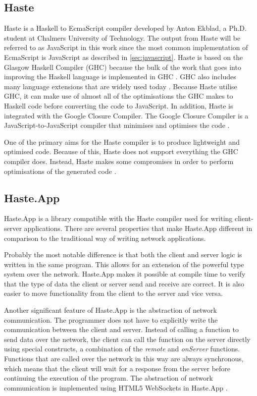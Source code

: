 \documentclass[a4paper]{article}
\begin{document}
\subsection{Haste}
Haste is a Haskell to EcmaScript compiler developed by Anton Ekblad, a Ph.D. student at Chalmers University of Technology. The output from Haste will be referred to as JavaScript in this work since the most common implementation of EcmaScript is JavaScript as described in \cref{sec:javascript}. Haste is based on the Glasgow Haskell Compiler (GHC) because the bulk of the work that goes into improving the Haskell language is implemented in GHC \cite{ghc-compiler}. GHC also includes many language extensions that are widely used today \cite{ekblad2015seamless}. Because Haste utilise GHC, it can make use of almost all of the optimisations the GHC makes to Haskell code before converting the code to JavaScript. In addition, Haste is integrated with the Google Closure Compiler. The Google Closure Compiler is a JavaScript-to-JavaScript compiler that minimises and optimises the code \cite{google-closure}.

One of the primary aims for the Haste compiler is to produce lightweight and optimised code. Because of this, Haste does not support everything the GHC compiler does. Instead, Haste makes some compromises in order to perform optimisations of the generated code \cite{ekblad2015seamless}.

\subsection{Haste.App}
Haste.App is a library compatible with the Haste compiler used for writing client-server applications. There are several properties that make Haste.App different in comparison to the traditional way of writing network applications. 

Probably the most notable difference is that both the client and server logic is written in the same program. This allows for an extension of the powerful type system over the network. Haste.App makes it possible at compile time to verify that the type of data the client or server send and receive are correct. It is also easier to move functionality from the client to the server and vice versa.

Another significant feature of Haste.App is the abstraction of network communication. The programmer does not have to explicitly write the communication between the client and server. Instead of calling a function to send data over the network, the client can call the function on the server directly using special constructs, a combination of the \textit{remote} and \textit{onServer} functions. Functions that are called over the network in this way are always synchronous, which means that the client will wait for a response from the server before continuing the execution of the program. The abstraction of network communication is implemented using HTML5 WebSockets in Haste.App \cite{a-distributed-haskell-for-the-modern-web}.
\end{document}
